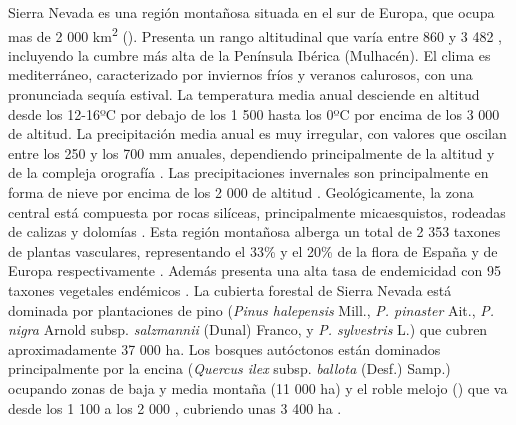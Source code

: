 Sierra Nevada es una región montañosa situada en el sur de Europa, que ocupa mas de 2 000 km\textsuperscript{2} (). Presenta un rango altitudinal que varía entre 860 y 3 482 \elev, incluyendo la cumbre más alta de la Península Ibérica (Mulhacén). El clima es mediterráneo, caracterizado por inviernos fríos y veranos calurosos, con una pronunciada sequía estival. La temperatura media anual desciende en altitud desde los 12-16ºC por debajo de los 1 500 \elev hasta los 0ºC por encima de los 3 000 \elev de altitud. La precipitación media anual es muy irregular, con valores que oscilan entre los 250 y los 700 mm anuales, dependiendo  principalmente de la altitud y de la compleja orografía \autocites{PeinoCalero2020AnalisisVariabilidad, PerezLuqueetal2021ClimaNevadaBase}. Las precipitaciones invernales son principalmente en forma de nieve por encima de los 2 000 \elev de altitud \autocite{PerezPalazonetal2015ExtremeValues}. Geológicamente, la zona central está compuesta por rocas silíceas, principalmente micaesquistos, rodeadas de calizas y dolomías \autocite{RodriguezFernandez2017ParqueNacional}. Esta región montañosa alberga un total de 2 353 taxones de plantas vasculares, representando el 33\% y el 20\% de la flora de España y de Europa respectivamente \autocite{Lorite2016UpdatedChecklist}. Además presenta una alta tasa de endemicidad con 95 taxones vegetales endémicos \autocites{Loriteetal2007EstimationThreatened,Loriteetal2020FloraSNevadaTrait}. La cubierta forestal de Sierra Nevada está dominada por plantaciones de pino (\emph{Pinus halepensis} Mill., \emph{P. pinaster} Ait., \emph{P. nigra} Arnold subsp. \emph{salzmannii} (Dunal) Franco, y \emph{P. sylvestris} L.) que cubren aproximadamente 37 000 ha. Los bosques autóctonos están dominados principalmente por la encina (\emph{Quercus ilex} subsp. \emph{ballota} (Desf.) Samp.) ocupando zonas de baja y media montaña (11 000 ha) y el roble melojo (\Qpw) que va desde los 1 100 a los 2 000 \elev, cubriendo unas 3 400 ha \autocites{Lorite2001VegetacionSierra, PerezLuqueetal2019MapEcosystems}.

